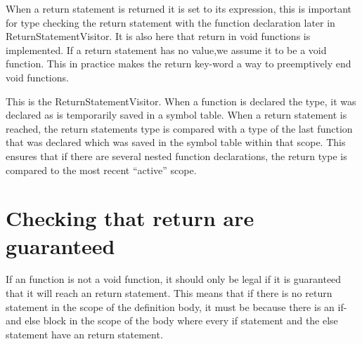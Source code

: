 When a return statement is returned it is set to its expression, this is important for type checking the return statement with the function declaration later in ReturnStatementVisitor.
It is also here that return in void functions is implemented. If a return statement has no value,we assume it to be a void function. This in practice makes the return key-word a way to preemptively end void functions.

\noindent\newline

This is the ReturnStatementVisitor. When a function is declared the type, it was declared as is temporarily saved in a symbol table. When a return statement is reached, the return statements type is compared with a type of the last function that was declared which was saved in the symbol table within that scope. This ensures that if there are several nested function declarations, the return type is compared to the most recent “active” scope.

\noindent\newline


\noindent\newline

\section{Checking that return are guaranteed}
If an function is not a void function, it should only be legal if it is guaranteed that it will reach an return statement. This means that if there is no return statement in the scope of the definition body, it must be because there is an if- and else block in the scope of the body where every if statement and the else statement have an return statement. 

\noindent\newline


\noindent\newline


\noindent\newline